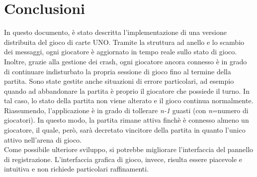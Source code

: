 \documentclass[11pt]{article} %
\begin{document}
\section{Conclusioni}
In questo documento, è stato descritta l'implementazione di una versione distribuita del gioco di carte UNO. Tramite la struttura ad anello e 
lo scambio dei messaggi, ogni giocatore è aggiornato in tempo reale sullo stato di gioco. 
Inoltre, grazie alla gestione dei crash, ogni giocatore ancora connesso è in grado di continuare indisturbato
la propria sessione di gioco fino al termine della partita. Sono state gestite anche situazioni di errore particolari, ad esempio quando ad abbandonare
la partita è proprio il giocatore che possiede il turno. In tal caso, lo stato della partita non viene alterato e il gioco continua normalmente. 
Riassumendo, l'applicazione è in grado di tollerare \emph{n-1} guasti (con \emph{n}=numero di giocatori). In questo modo, la partita rimane attiva finchè è 
connesso almeno un giocatore, il quale, però, sarà decretato vincitore della partita in quanto l'unico attivo nell'arena di gioco.\\
Come possibile ulteriore sviluppo, si potrebbe migliorare l'interfaccia del pannello di registrazione.
L'interfaccia grafica di gioco, invece, risulta essere piacevole e intuitiva e non richiede particolari raffinamenti.  
\end{document}
